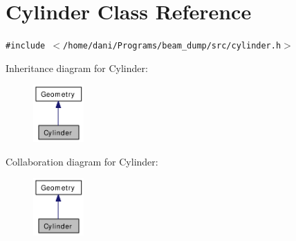 \hypertarget{classCylinder}{
\section{Cylinder Class Reference}
\label{classCylinder}
}
{\tt \#include $<$/home/dani/Programs/beam\_\-dump/src/cylinder.h$>$}

Inheritance diagram for Cylinder:\nopagebreak
\begin{figure}[H]
\begin{center}
\leavevmode
\includegraphics[width=55pt]{classCylinder__inherit__graph}
\end{center}
\end{figure}
Collaboration diagram for Cylinder:\nopagebreak
\begin{figure}[H]
\begin{center}
\leavevmode
\includegraphics[width=55pt]{classCylinder__coll__graph}
\end{center}
\end{figure}
